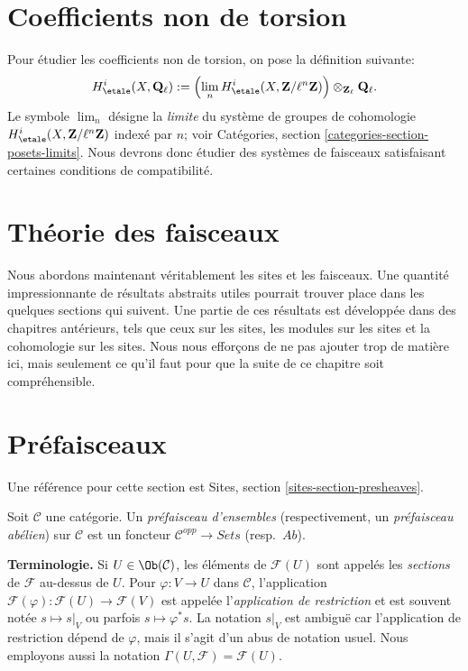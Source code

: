 \section{Coefficients non de torsion}
\label{section-nontorsion}

\noindent
Pour \'etudier les coefficients non de torsion, on pose la d\'efinition suivante:
$$
H_\etale^i (X, \mathbf{Q}_\ell) :=
\left( \lim_n H_\etale^i(X, \mathbf{Z}/\ell^n\mathbf{Z}) \right)
\otimes_{\mathbf{Z}_\ell} \mathbf{Q}_\ell.
$$
Le symbole $\lim_n$ d\'esigne la {\it limite} du syst\`eme de groupes de
cohomologie $H_\etale^i(X, \mathbf{Z}/\ell^n\mathbf{Z})$ index\'e par $n$; voir
Cat\'egories, section \ref{categories-section-posets-limits}.
Nous devrons donc \'etudier des syst\`emes de faisceaux satisfaisant certaines
conditions de compatibilit\'e.




\section{Th\'eorie des faisceaux}
\label{section-sheaf-theory}

\noindent
Nous abordons maintenant v\'eritablement les sites et les faisceaux.
Une quantit\'e impressionnante de r\'esultats abstraits utiles pourrait trouver place
dans les quelques sections qui suivent. Une partie de ces r\'esultats est d\'evelopp\'ee dans des
chapitres ant\'erieurs, tels que ceux sur les sites, les modules sur les sites et la cohomologie
sur les sites. Nous nous effor\c{c}ons de ne pas ajouter trop de mati\`ere ici, mais seulement
ce qu'il faut pour que la suite de ce chapitre soit compr\'ehensible.




\section{Pr\'efaisceaux}
\label{section-presheaves}

\noindent
Une r\'ef\'erence pour cette section est
Sites, section \ref{sites-section-presheaves}.

\begin{definition}
\label{definition-presheaf}
Soit $\mathcal{C}$ une cat\'egorie. Un {\it pr\'efaisceau d'ensembles} (respectivement, un
{\it pr\'efaisceau ab\'elien}) sur $\mathcal{C}$ est un foncteur $\mathcal{C}^{opp} \to
\textit{Sets}$ (resp.\ $\textit{Ab}$).
\end{definition}

\noindent
{\bf Terminologie.} Si $U \in \Ob(\mathcal{C})$, les \'el\'ements de
$\mathcal{F}(U)$ sont appel\'es les {\it sections} de $\mathcal{F}$ au-dessus de
$U$. Pour $\varphi : V \to U$ dans $\mathcal{C}$, l'application
$\mathcal{F}(\varphi) : \mathcal{F}(U) \to \mathcal{F}(V)$
est appel\'ee l'{\it application de restriction} et est souvent not\'ee $s \mapsto s|_V$
ou parfois $s \mapsto \varphi^*s$. La notation $s|_V$ est ambigu\"e
car l'application de restriction d\'epend de $\varphi$, mais il s'agit d'un abus
de notation usuel. Nous employons aussi la notation
$\Gamma(U, \mathcal{F}) = \mathcal{F}(U)$.

